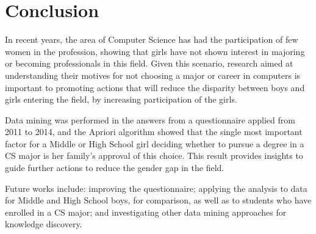 \section{Conclusion}\label{sec:conclusion}%

In recent years, the area of Computer Science has had the participation of few women in the profession, showing that girls have not shown interest in majoring or becoming professionals in this field. Given this scenario, research aimed at understanding their motives for not choosing a major or career in computers is important to promoting actions that will reduce the disparity between boys and girls entering the field, by increasing participation of the girls.

Data mining was performed in the answers from a questionnaire applied from 2011 to 2014, and the Apriori algorithm showed that the single most important factor for a Middle or High School girl deciding whether to pursue a degree in a CS major is her family's approval of this choice. This result provides insights to guide further actions to reduce the gender gap in the field.

Future works include: improving the questionnaire; applying the analysis to data for  Middle and High School boys, for comparison, as well as to students who have enrolled in a CS major; and investigating other data mining approaches for knowledge discovery.

